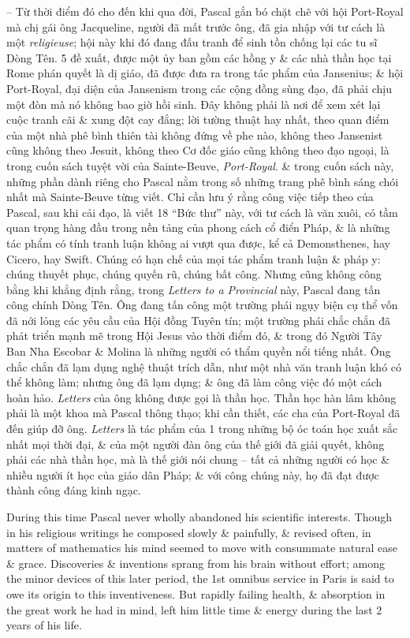 \documentclass{article}
\begin{document}
\begin{enumerate}
\begin{itemize}
		-- Từ thời điểm đó cho đến khi qua đời, {\sc Pascal} gắn bó chặt chẽ với hội Port-Royal mà chị gái ông {\sc Jacqueline}, người đã mất trước ông, đã gia nhập với tư cách là một {\it religieuse}; hội này khi đó đang đấu tranh để sinh tồn chống lại các tu sĩ Dòng Tên. 5 đề xuất, được một ủy ban gồm các hồng y \& các nhà thần học tại Rome phán quyết là dị giáo, đã được đưa ra trong tác phẩm của Jansenius; \& hội Port-Royal, đại diện của Jansenism trong các cộng đồng sùng đạo, đã phải chịu một đòn mà nó không bao giờ hồi sinh. Đây không phải là nơi để xem xét lại cuộc tranh cãi \& xung đột cay đắng; lời tường thuật hay nhất, theo quan điểm của một nhà phê bình thiên tài không đứng về phe nào, không theo Jansenist cũng không theo Jesuit, không theo Cơ đốc giáo cũng không theo đạo ngoại, là trong cuốn sách tuyệt vời của {\sc Sainte-Beuve}, {\it Port-Royal}. \& trong cuốn sách này, những phần dành riêng cho {\sc Pascal} nằm trong số những trang phê bình sáng chói nhất mà {\sc Sainte-Beuve} từng viết. Chỉ cần lưu ý rằng công việc tiếp theo của {\sc Pascal}, sau khi cải đạo, là viết 18 ``Bức thư'' này, với tư cách là văn xuôi, có tầm quan trọng hàng đầu trong nền tảng của phong cách cổ điển Pháp, \& là những tác phẩm có tính tranh luận không ai vượt qua được, kể cả {\sc Demonsthenes}, hay {\sc Cicero}, hay {\sc Swift}. Chúng có hạn chế của mọi tác phẩm tranh luận \& pháp y: chúng thuyết phục, chúng quyến rũ, chúng bất công. Nhưng cũng không công bằng khi khẳng định rằng, trong {\it Letters to a Provincial} này, {\sc Pascal} đang tấn công chính Dòng Tên. Ông đang tấn công một trường phái ngụy biện cụ thể vốn đã nới lỏng các yêu cầu của Hội đồng Tuyên tín; một trường phái chắc chắn đã phát triển mạnh mẽ trong Hội Jesus vào thời điểm đó, \& trong đó {\sc Người Tây Ban Nha Escobar \& Molina} là những người có thẩm quyền nổi tiếng nhất. Ông chắc chắn đã lạm dụng nghệ thuật trích dẫn, như một nhà văn tranh luận khó có thể không làm; nhưng ông đã lạm dụng; \& ông đã làm công việc đó một cách hoàn hảo. {\it Letters} của ông không được gọi là thần học. Thần học hàn lâm không phải là một khoa mà {\sc Pascal} thông thạo; khi cần thiết, các cha của Port-Royal đã đến giúp đỡ ông. {\it Letters} là tác phẩm của 1 trong những bộ óc toán học xuất sắc nhất mọi thời đại, \& của một người đàn ông của thế giới đã giải quyết, không phải các nhà thần học, mà là thế giới nói chung -- tất cả những người có học \& nhiều người ít học của giáo dân Pháp; \& với công chúng này, họ đã đạt được thành công đáng kinh ngạc.
		
		During this time {\sc Pascal} never wholly abandoned his scientific interests. Though in his religious writings he composed slowly \& painfully, \& revised often, in matters of mathematics his mind seemed to move with consummate natural ease \& grace. Discoveries \& inventions sprang from his brain without effort; among the minor devices of this later period, the 1st omnibus service in Paris is said to owe its origin to this inventiveness. But rapidly failing health, \& absorption in the great work he had in mind, left him little time \& energy during the last 2 years of his life.
		

\end{itemize}
\end{enumerate}
\end{document}

